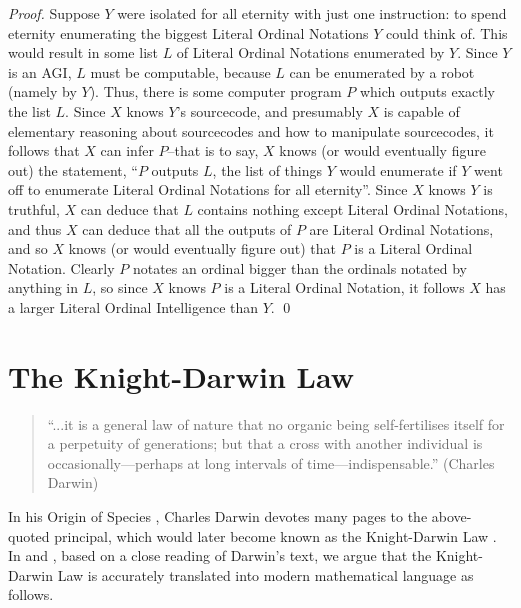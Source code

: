 \documentclass[runningheads]{llncs}
\begin{document}
\begin{proof}
    Suppose $Y$ were isolated for all eternity with just one instruction:
    to spend eternity enumerating the biggest Literal Ordinal Notations $Y$ could
    think of. This would result in some list $L$ of Literal Ordinal Notations
    enumerated by $Y$. Since $Y$ is an AGI, $L$ must be computable, because $L$ can
    be enumerated by a robot (namely by $Y$). Thus, there is some computer program
    $P$ which outputs exactly the list $L$. Since $X$ knows $Y$'s sourcecode,
    and presumably $X$ is capable of elementary reasoning about sourcecodes and
    how to manipulate sourcecodes, it follows that $X$ can infer $P$--that is to
    say, $X$ knows (or would eventually figure out) the statement, ``$P$ outputs
    $L$, the list of things $Y$ would enumerate if $Y$ went off to enumerate
    Literal Ordinal Notations for all eternity''. Since $X$ knows $Y$ is truthful,
    $X$ can deduce that $L$ contains nothing except Literal Ordinal Notations,
    and thus $X$ can deduce that all the outputs of $P$ are Literal Ordinal Notations,
    and so $X$ knows (or would eventually figure out) that $P$ is a Literal Ordinal Notation.
    Clearly $P$ notates an ordinal bigger than the ordinals notated by anything in $L$,
    so since $X$ knows $P$ is a Literal Ordinal Notation, it follows $X$ has a larger
    Literal Ordinal Intelligence than $Y$.
    \qed
\end{proof}

\section{The Knight-Darwin Law}
\label{kdlawsection}

\begin{quote}
``...it is a general law of nature that no organic being self-fertilises itself
for a perpetuity of generations; but that a cross with another individual
is occasionally---perhaps at long intervals of time---indispensable.''
(Charles Darwin)
\end{quote}

In his Origin of Species \cite{originofspecies}, Charles Darwin devotes many
pages to the above-quoted principal, which would later become known as the
Knight-Darwin Law \cite{darwin1898knight}. In \cite{alexander2013} and
\cite{alexander2015alternative}, based on a close reading of Darwin's text, we argue
that the Knight-Darwin Law is accurately translated into modern mathematical
language as follows.
\end{document}
